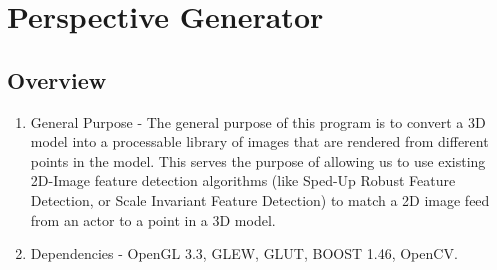 \documentclass[a4paper,11pt]{article}
\begin{document}
        
        
        
    \section{Perspective Generator}

        \subsection{Overview}
        \begin{enumerate}
        \item General Purpose - The general purpose of this program is to convert a 3D model into a processable library of images that are rendered from 
        different points in the model. This serves the purpose of allowing us to use existing 2D-Image feature detection algorithms 
        (like Sped-Up Robust Feature Detection, or Scale Invariant Feature Detection) to match a 2D image feed from an actor to a point in a 3D model.
        \item Dependencies - OpenGL 3.3, GLEW, GLUT, BOOST 1.46, OpenCV.
        \end{enumerate}
        
\end{document}
